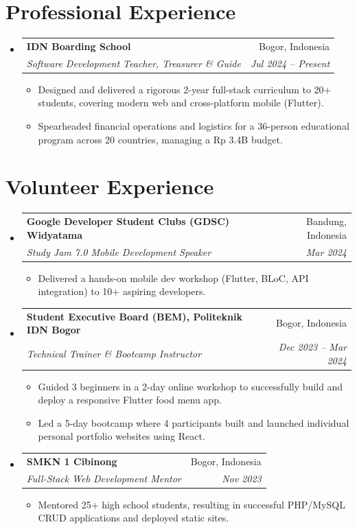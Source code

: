 \documentclass[a4paper,10pt]{article}
\makeatletter
\newcommand{\resumeSubheading}[4]{
  \vspace{-1pt}\item
    \begin{tabular*}{0.97\textwidth}[t]{l@{\extracolsep{\fill}}r}
      \textbf{#1} & #2 \\
      \textit{\small #3} & \textit{\small #4} \\
    \end{tabular*}\vspace{-5pt}
}
\newcommand{\resumeItemPlain}[1]{
  \item\small{
    {#1 \vspace{-2pt}}
  }
}
\newcommand{\resumeSubHeadingListStart}{\begin{itemize}[leftmargin=*]}
\newcommand{\resumeSubHeadingListEnd}{\end{itemize}}
\newcommand{\resumeItemListStart}{\begin{itemize}}
\newcommand{\resumeItemListEnd}{\end{itemize}\vspace{-5pt}}
\makeatother
\begin{document}
\section{Professional Experience}
  \resumeSubHeadingListStart
    \resumeSubheading
      {IDN Boarding School}{Bogor, Indonesia}
      {Software Development Teacher, Treasurer \& Guide}{Jul 2024 -- Present}
      \resumeItemListStart
        \resumeItemPlain{Designed and delivered a rigorous 2-year full-stack curriculum to 20+ students, covering modern web and cross-platform mobile (Flutter).}
        \resumeItemPlain{Spearheaded financial operations and logistics for a 36-person educational program across 20 countries, managing a Rp 3.4B budget.}
      \resumeItemListEnd
  \resumeSubHeadingListEnd

\section{Volunteer Experience}
  \resumeSubHeadingListStart
    \resumeSubheading
      {Google Developer Student Clubs (GDSC) Widyatama}{Bandung, Indonesia}
      {Study Jam 7.0 Mobile Development Speaker}{Mar 2024}
      \resumeItemListStart
        \resumeItemPlain{Delivered a hands-on mobile dev workshop (Flutter, BLoC, API integration) to 10+ aspiring developers.}
      \resumeItemListEnd
      \vspace{3pt}

    \resumeSubheading
      {Student Executive Board (BEM), Politeknik IDN Bogor}{Bogor, Indonesia}
      {Technical Trainer \& Bootcamp Instructor}{Dec 2023 -- Mar 2024}
      \resumeItemListStart
        \resumeItemPlain{Guided 3 beginners in a 2-day online workshop to successfully build and deploy a responsive Flutter food menu app.}
        \resumeItemPlain{Led a 5-day bootcamp where 4 participants built and launched individual personal portfolio websites using React.}
      \resumeItemListEnd
      \vspace{3pt}

    \resumeSubheading
      {SMKN 1 Cibinong}{Bogor, Indonesia}
      {Full-Stack Web Development Mentor}{Nov 2023}
      \resumeItemListStart
        \resumeItemPlain{Mentored 25+ high school students, resulting in successful PHP/MySQL CRUD applications and deployed static sites.}
      \resumeItemListEnd
  \resumeSubHeadingListEnd

\end{document}
